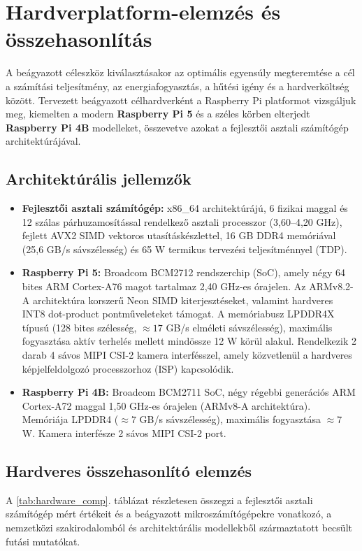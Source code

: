 \documentclass[12pt,a4paper,oneside]{report}
\begin{document}
\section{Hardverplatform-elemzés és összehasonlítás}
A beágyazott céleszköz kiválasztásakor az optimális egyensúly megteremtése a cél a számítási teljesítmény, az energiafogyasztás, a hűtési igény és a hardverköltség között. Tervezett beágyazott célhardverként a Raspberry Pi platformot vizsgáljuk meg, kiemelten a modern \textbf{Raspberry Pi 5} és a széles körben elterjedt \textbf{Raspberry Pi 4B} modelleket, összevetve azokat a fejlesztői asztali számítógép architektúrájával.

\subsection{Architektúrális jellemzők}
\begin{itemize}
    \item \textbf{Fejlesztői asztali számítógép:} x86\_64 architektúrájú, 6 fizikai maggal és 12 szálas párhuzamosítással rendelkező asztali processzor (3,60--4,20 GHz), fejlett AVX2 SIMD vektoros utasításkészlettel, 16 GB DDR4 memóriával (25,6 GB/s sávszélesség) és 65 W termikus tervezési teljesítménnyel (TDP).
    \item \textbf{Raspberry Pi 5:} Broadcom BCM2712 rendszerchip (SoC), amely négy 64 bites ARM Cortex-A76 magot tartalmaz 2,40 GHz-es órajelen. Az ARMv8.2-A architektúra korszerű Neon SIMD kiterjesztéseket, valamint hardveres INT8 dot-product pontműveleteket támogat. A memóriabusz LPDDR4X típusú (128 bites szélesség, $\approx 17$ GB/s elméleti sávszélesség), maximális fogyasztása aktív terhelés mellett mindössze 12 W körül alakul. Rendelkezik 2 darab 4 sávos MIPI CSI-2 kamera interfésszel, amely közvetlenül a hardveres képjelfeldolgozó processzorhoz (ISP) kapcsolódik.
    \item \textbf{Raspberry Pi 4B:} Broadcom BCM2711 SoC, négy régebbi generációs ARM Cortex-A72 maggal 1,50 GHz-es órajelen (ARMv8-A architektúra). Memóriája LPDDR4 ($\approx 7$ GB/s sávszélesség), maximális fogyasztása $\approx 7$ W. Kamera interfésze 2 sávos MIPI CSI-2 port.
\end{itemize}

\subsection{Hardveres összehasonlító elemzés}
A \ref{tab:hardware_comp}. táblázat részletesen összegzi a fejlesztői asztali számítógép mért értékeit és a beágyazott mikroszámítógépekre vonatkozó, a nemzetközi szakirodalomból és architektúrális modellekből \cite{yolov8pose, openvino2022, armneon2020} származtatott becsült futási mutatókat.
\end{document}
